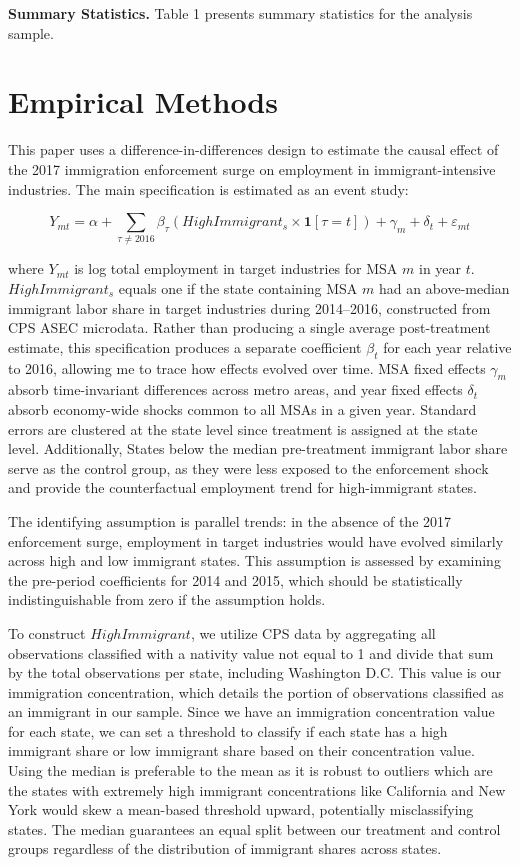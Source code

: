 \documentclass[12pt]{article}
\begin{document}
\textbf{Summary Statistics.} Table 1 presents summary statistics for
the analysis sample.

\section{Empirical Methods}

This paper uses a difference-in-differences design to estimate the causal effect of the 2017 immigration enforcement surge on employment in immigrant-intensive industries. The main specification is estimated as an event study:

\begin{equation}
Y_{mt} = \alpha + \sum_{\tau \neq 2016} \beta_\tau (HighImmigrant_s \times \mathbf{1}[\tau = t]) + \gamma_m + \delta_t + \varepsilon_{mt}
\end{equation}

where $Y_{mt}$ is log total employment in target industries for MSA $m$ in year $t$. $HighImmigrant_s$ equals one if the state containing MSA $m$ had an above-median immigrant labor share in target industries during 2014--2016, constructed from CPS ASEC microdata. Rather than producing a single average post-treatment estimate, this specification produces a separate coefficient $\beta_t$ for each year relative to 2016, allowing me to trace how effects evolved over time. MSA fixed effects $\gamma_m$ absorb time-invariant differences across metro areas, and year fixed effects $\delta_t$ absorb economy-wide shocks common to all MSAs in a given year. Standard errors are clustered at the state level since treatment is assigned at the state level. Additionally, States below the median pre-treatment immigrant labor share serve as the control group, as they were less exposed to the enforcement shock and provide the counterfactual 
employment trend for high-immigrant states. 

The identifying assumption is parallel trends: in the absence of the 2017 enforcement surge, employment in target industries would have evolved similarly across high and low immigrant states. This assumption is assessed by examining the pre-period coefficients for 2014 and 2015, which should be statistically indistinguishable from zero if the assumption holds.

To construct $HighImmigrant$, we utilize CPS data by aggregating all observations classified with a nativity value not equal to 1 and divide that sum by the total observations per state, including Washington D.C. This value is our immigration concentration, which details the portion of observations classified as an immigrant in our sample. Since we have an immigration concentration value for each state, we can set a threshold to classify if each state has a high immigrant share or low immigrant share based on their concentration value. Using the median is preferable to the mean as it is robust to outliers which are the states with extremely high immigrant concentrations like California and New York would skew a mean-based threshold upward, potentially misclassifying states. The median guarantees an equal split between our treatment and control groups regardless of the distribution of immigrant shares across states.
\end{document}
